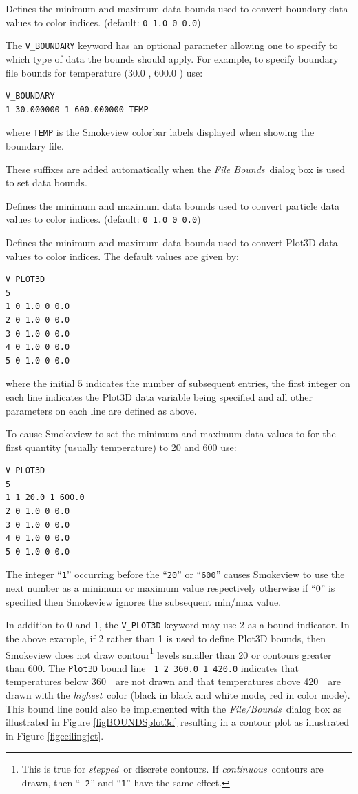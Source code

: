 \documentclass[11pt,twoside]{book}
\newcommand{\hitem}[1]{\item[{\bf #1} \hfill]}
\begin{document}
\hitem{V\_BOUNDARY}Defines the minimum and maximum
data bounds used to convert boundary data values to color indices.
(default: {\tt 0 1.0 0 0.0})

The {\tt V\_BOUNDARY} keyword has an optional parameter allowing
one to specify to which type of data the bounds should apply. For
example, to specify boundary file bounds for temperature (30.0
\degC, 600.0 \degC) use:
\begin{lstlisting}
V_BOUNDARY
1 30.000000 1 600.000000 TEMP
\end{lstlisting}
where {\tt TEMP} is the Smokeview colorbar labels displayed when
showing the boundary file.

These suffixes are added automatically when the {\em File Bounds}\
dialog box is used to set data bounds.

\hitem{V\_PARTICLES}Defines the minimum and maximum
data bounds used to convert particle data values to color indices.
(default: {\tt 0 1.0 0 0.0})

\hitem{V\_PLOT3D}Defines the minimum and maximum data bounds used
to convert Plot3D data values to color indices. The default values
are given by:
\begin{lstlisting}
V_PLOT3D
5
1 0 1.0 0 0.0
2 0 1.0 0 0.0
3 0 1.0 0 0.0
4 0 1.0 0 0.0
5 0 1.0 0 0.0
\end{lstlisting}
where the initial $5$ indicates the number of subsequent entries,
the first integer on each line indicates the Plot3D data variable
being specified and all other parameters on each line are defined
as above.

To cause Smokeview to set the minimum and maximum data values to
for the first quantity (usually temperature) to 20 and 600 use:

\begin{lstlisting}
V_PLOT3D
5
1 1 20.0 1 600.0
2 0 1.0 0 0.0
3 0 1.0 0 0.0
4 0 1.0 0 0.0
5 0 1.0 0 0.0
\end{lstlisting}
The integer ``{\tt 1}'' occurring before the ``{\tt 20}'' or
``{\tt 600}'' causes Smokeview to use the next number as a minimum
or maximum value respectively otherwise if ``0'' is specified then
Smokeview ignores the subsequent min/max value.

In addition to 0 and 1, the {\tt V\_PLOT3D} keyword may use 2 as a
bound indicator. In the above example, if 2 rather than 1 is used
to define Plot3D bounds, then Smokeview does not draw
contour\footnote{This is true for {\em stepped}\ or discrete
contours.  If {\em continuous}\ contours are drawn, then ``{\tt
2}'' and ``{\tt 1}'' have the same effect. } levels smaller than
20 or contours greater than 600. The {\tt Plot3D} bound line {\tt
1 2 360.0 1 420.0} indicates that temperatures below 360~\degC\
are not drawn and that temperatures above 420~\degC\ are drawn
with the {\em highest}\ color (black in black and white mode, red
in color mode).  This bound line could also be implemented with
the {\em File/Bounds}\ dialog box as illustrated in Figure
\ref{figBOUNDSplot3d} resulting in a contour plot as illustrated
in Figure \ref{figceilingjet}.
\end{document}
